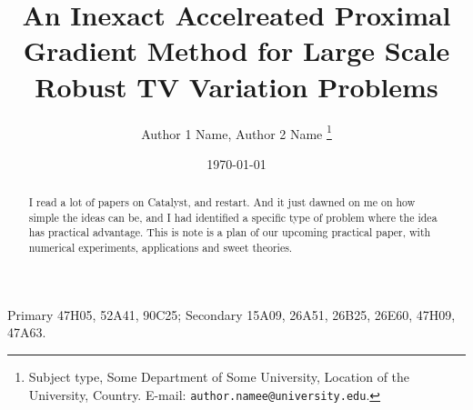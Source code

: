 \documentclass[12pt]{article}
\begin{document}
\title{{\selectfont An Inexact Accelreated Proximal Gradient Method for Large Scale Robust TV Variation Problems}}

\author{
    Author 1 Name, Author 2 Name
    \thanks{
        Subject type, Some Department of Some University, Location of the University,
        Country. E-mail: \texttt{author.namee@university.edu}.
    }
}

\date{\today}

\maketitle
{}

\begin{abstract} 
    \noindent
    I read a lot of papers on Catalyst, and restart. 
    And it just dawned on me on how simple the ideas can be, and I had identified a specific type of problem where the idea has practical advantage. 
    This is note is a plan of our upcoming practical paper, with numerical experiments, applications and sweet theories. 
\end{abstract}

Primary 47H05, 52A41, 90C25; Secondary 15A09, 26A51, 26B25, 26E60, 47H09, 47A63.

\end{document}
